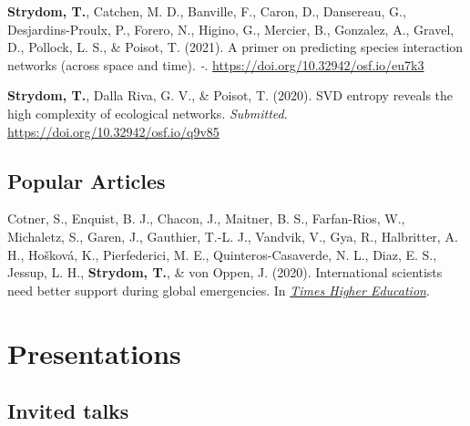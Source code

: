 \documentclass[11pt, a4paper]{awesome-cv}
\begin{document}
\begingroup
\setlength{\parindent}{-0.5in}
\setlength{\leftskip}{0.5in}

\hypertarget{refs_review}{}
\leavevmode\hypertarget{ref-StrydomPriPre2021}{}%
\textbf{Strydom, T.}, Catchen, M. D., Banville, F., Caron, D., Dansereau, G., Desjardins-Proulx, P., Forero, N., Higino, G., Mercier, B., Gonzalez, A., Gravel, D., Pollock, L. S., \& Poisot, T. (2021). A primer on predicting species interaction networks (across space and time). \emph{-}. \url{https://doi.org/10.32942/osf.io/eu7k3}

\leavevmode\hypertarget{ref-StrydomSVDEnt2020}{}%
\textbf{Strydom, T.}, Dalla Riva, G. V., \& Poisot, T. (2020). SVD entropy reveals the high complexity of ecological networks. \emph{Submitted}. \url{https://doi.org/10.32942/osf.io/q9v85}

\endgroup
\vspace{\baselineskip}

\hypertarget{popular-articles}{%
\subsection{\texorpdfstring{\textbf{Popular Articles}}{Popular Articles}}\label{popular-articles}}

\begingroup
\setlength{\parindent}{-0.5in}
\setlength{\leftskip}{0.5in}

\hypertarget{refs_popular}{}
\leavevmode\hypertarget{ref-peru2020}{}%
Cotner, S., Enquist, B. J., Chacon, J., Maitner, B. S., Farfan-Rios, W., Michaletz, S., Garen, J., Gauthier, T.-L. J., Vandvik, V., Gya, R., Halbritter, A. H., Hošková, K., Pierfederici, M. E., Quinteros-Casaverde, N. L., Diaz, E. S., Jessup, L. H., \textbf{Strydom, T.}, \& von Oppen, J. (2020). International scientists need better support during global emergencies. In \emph{\href{https://tinyurl.com/y5ccw9nb}{Times Higher Education}}.

\endgroup

\hypertarget{presentations}{%
\section{Presentations}\label{presentations}}

\vspace{\baselineskip}

\hypertarget{invited-talks}{%
\subsection{\texorpdfstring{\textbf{Invited talks}}{Invited talks}}\label{invited-talks}}
\end{document}
